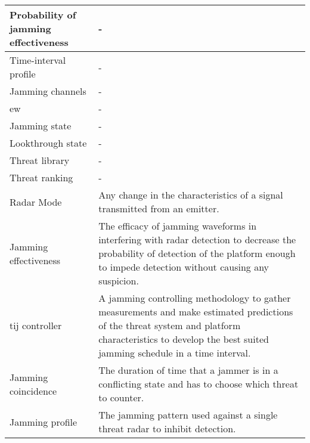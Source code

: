 \begin{longtable}{ | p{5cm} |  p{10cm} | }
    Probability of jamming effectiveness  & - \\ \hline
    
    Time-interval profile   & - \\ \hline
    
    Jamming channels        & - \\ \hline
    
    \gls{ew}                & - \\ \hline
    
    Jamming state           & - \\ \hline
    
    Lookthrough state       & - \\ \hline
    
    Threat library          & - \\ \hline
    
    Threat ranking          & - \\ \hline

	Radar Mode              & Any change in the characteristics of a signal transmitted from an emitter.                                                                                                                                \\ \hline

	Jamming effectiveness   & The efficacy of jamming waveforms in interfering with radar detection to decrease the probability of detection of the platform enough to impede detection without causing any suspicion.                  \\ \hline

    \Gls{tij} controller    & A jamming controlling methodology to gather measurements and make estimated predictions of the threat system and platform characteristics to develop the best suited jamming schedule in a time interval. \\ \hline

    Jamming coincidence     & The duration of time that a jammer is in a conflicting state and has to choose which threat to counter.\\ \hline

    Jamming profile        & The jamming pattern used against a single threat radar to inhibit detection.\\ \hline
\end{longtable}

%